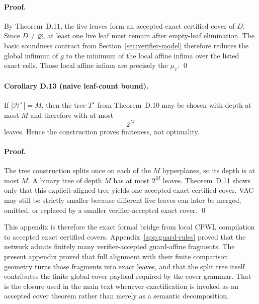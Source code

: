 \paragraph{Proof.}
By Theorem~D.11, the live leaves form an accepted exact certified cover of $D$. Since $D\neq\varnothing$, at least one live leaf must remain after empty-leaf elimination. The basic soundness contract from Section~\ref{sec:verifier-model} therefore reduces the global infimum of $g$ to the minimum of the local affine infima over the listed exact cells. Those local affine infima are precisely the $\mu_v$. \qed

\paragraph{Corollary D.13 (naive leaf-count bound).}
If $|\mathcal H^\star|=M$, then the tree $T^\star$ from Theorem~D.10 may be chosen with depth at most $M$ and therefore with at most
\[
 2^M
\]
leaves. Hence the construction proves finiteness, not optimality.

\paragraph{Proof.}
The tree construction splits once on each of the $M$ hyperplanes, so its depth is at most $M$. A binary tree of depth $M$ has at most $2^M$ leaves. Theorem~D.11 shows only that this explicit aligned tree yields one accepted exact certified cover. VAC may still be strictly smaller because different live leaves can later be merged, omitted, or replaced by a smaller verifier-accepted exact cover. \qed

This appendix is therefore the exact formal bridge from local CPWL compilation to accepted exact certified covers. Appendix~\ref{app:guard-rules} proved that the network admits finitely many verifier-accepted guard-affine fragments. The present appendix proved that full alignment with their finite comparison geometry turns those fragments into exact leaves, and that the split tree itself contributes the finite global cover payload required by the cover grammar. That is the closure used in the main text whenever exactification is invoked as an accepted cover theorem rather than merely as a semantic decomposition.
